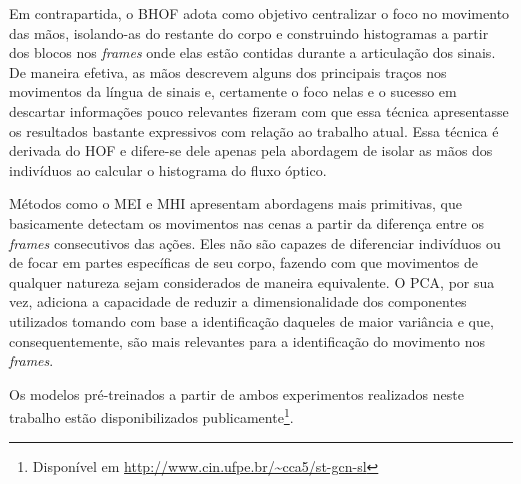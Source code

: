 Em contrapartida, o BHOF \cite{lim-2016} adota como objetivo centralizar o foco no movimento das mãos, isolando-as do restante do corpo e construindo histogramas a partir dos blocos nos \textit{frames} onde elas estão contidas durante a articulação dos sinais. De maneira efetiva, as mãos descrevem alguns dos principais traços nos movimentos da língua de sinais e, certamente o foco nelas e o sucesso em descartar informações pouco relevantes fizeram com que essa técnica apresentasse os resultados bastante expressivos com relação ao trabalho atual. Essa técnica é derivada do HOF e difere-se dele apenas pela abordagem de isolar as mãos dos indivíduos ao calcular o histograma do fluxo óptico.

Métodos como o MEI e MHI apresentam abordagens mais primitivas, que basicamente detectam os movimentos nas cenas a partir da diferença entre os \textit{frames} consecutivos das ações. Eles não são capazes de diferenciar indivíduos ou de focar em partes específicas de seu corpo, fazendo com que movimentos de qualquer natureza sejam considerados de maneira equivalente. O PCA, por sua vez, adiciona a capacidade de reduzir a dimensionalidade dos componentes utilizados tomando com base a identificação daqueles de maior variância e que, consequentemente, são mais relevantes para a identificação do movimento nos \textit{frames}. 


Os modelos pré-treinados a partir de ambos experimentos realizados neste trabalho estão disponibilizados publicamente\footnote{
    Disponível em \url{http://www.cin.ufpe.br/~cca5/st-gcn-sl}
}.







